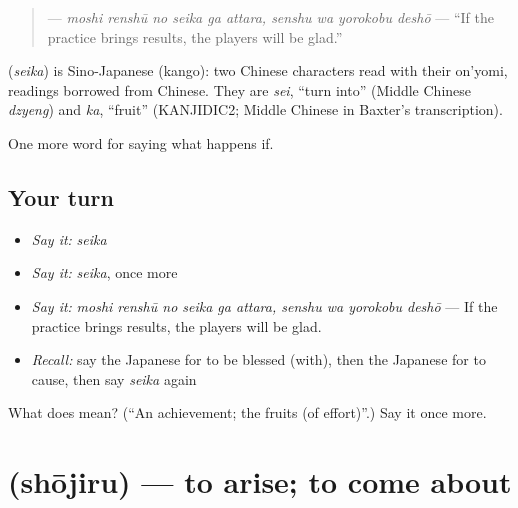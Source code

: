 \begin{quote}
\textbf{    } — \emph{moshi renshū no seika ga attara, senshu wa yorokobu deshō} — \textquotedblleft{}If the practice brings results, the players will be glad.\textquotedblright{}
\end{quote}

\begin{cousinweb}
\textbf{} (\emph{seika}) is Sino-Japanese (kango): two Chinese characters read with their on'yomi, readings borrowed from Chinese. They are \emph{sei}, \textquotedblleft{}turn into\textquotedblright{} (Middle Chinese \emph{dzyeng}) and \emph{ka}, \textquotedblleft{}fruit\textquotedblright{} (KANJIDIC2; Middle Chinese in Baxter's transcription).
\end{cousinweb}

\begin{grammarlens}[title={What you've built}]
One more word for saying what happens if.
\end{grammarlens}

\subsection*{Your turn}
\begin{itemize}
\raggedright
  \item \emph{Say it:} \emph{seika}
  \item \emph{Say it:} \emph{seika}, once more
  \item \emph{Say it:} \emph{moshi renshū no seika ga attara, senshu wa yorokobu deshō} — If the practice brings results, the players will be glad.
  \item \emph{Recall:} say the Japanese for to be blessed (with), then the Japanese for to cause, then say \emph{seika} again
\end{itemize}

\begin{tcolorbox}[breakable,colback=teal!4,colframe=teal!35!black,title={Before you move on}]
What does  mean? (\textquotedblleft{}An achievement; the fruits (of effort)\textquotedblright{}.) Say it once more.
\end{tcolorbox}
\section[\texorpdfstring{\ja{しょうじる} (shōjiru)}{しょうじる (shōjiru)}]{ (shōjiru) — to arise; to come about}

